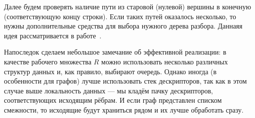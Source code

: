\begin{center}
\end{center}

Далее будем проверять наличие пути из старовой (нулевой) вершины в конечную (соответствующую концу строки). Если таких путей оказалось несколько, то нужны дополнительные средства для выбора нужного дерева разбора. Даннаяя идея рассматривается в работе~\cite{10.1145/3357766.3359532}.

Напоследок сделаем небольшое замечание об эффективной реализации: в качестве рабочего множества $ R $ можно использовать несколько различных структур данных и, как правило, выбирают очередь. Однако иногда (в особенности для графов) лучше использовать стек дескрипторов, так как в этом случае выше локальность данных --- мы кладём пачку дескрипторов, соответствующих исходящим рёбрам. И если граф представлен списком смежности, то исходящие будут храниться рядом и их лучше обработать сразу.


